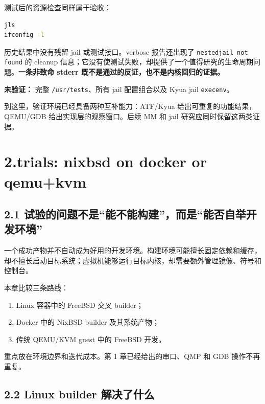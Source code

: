 \documentclass[
  11pt,
  UTF8,
  a4paper,
  fontset=fandol]{ctexart}
\newcommand{\passthrough}[1]{#1}
\providecommand{\tightlist}{%
  \setlength{\itemsep}{0pt}\setlength{\parskip}{0pt}}
\begin{document}
测试后的资源检查同样属于验收：

\begin{lstlisting}[language=sh]
jls
ifconfig -l
\end{lstlisting}

历史结果中没有残留 jail 或测试接口。verbose 报告还出现了
\passthrough{\lstinline!nestedjail not found!} 的 cleanup
信息；它没有使测试失败，却提供了一个值得研究的生命周期问题。\textbf{一条非致命
stderr 既不是通过的反证，也不是内核回归的证据。}

\textbf{未验证：} 完整 \passthrough{\lstinline!/usr/tests!}、所有 jail
配置组合以及 Kyua jail \passthrough{\lstinline!execenv!}。

到这里，验证环境已经具备两种互补能力：ATF/Kyua
给出可重复的功能结果，QEMU/GDB 给出实现层的观察窗口。后续 MM 和 jail
研究应同时保留这两类证据。

\section{2.trials: nixbsd on docker or
qemu+kvm}\label{trials-nixbsd-on-docker-or-qemukvm}

\subsection{2.1
试验的问题不是``能不能构建''，而是``能否自举开发环境''}\label{ux8bd5ux9a8cux7684ux95eeux9898ux4e0dux662fux80fdux4e0dux80fdux6784ux5efaux800cux662fux80fdux5426ux81eaux4e3eux5f00ux53d1ux73afux5883}

一个成功产物并不自动成为好用的开发环境。构建环境可能擅长固定依赖和缓存，却不擅长启动目标系统；虚拟机能够运行目标内核，却需要额外管理镜像、符号和控制台。

本章比较三条路线：

\begin{enumerate}
\def\labelenumi{\arabic{enumi}.}
\tightlist
\item
  Linux 容器中的 FreeBSD 交叉 builder；
\item
  Docker 中的 NixBSD builder 及其系统产物；
\item
  传统 QEMU/KVM guest 中的 FreeBSD 开发。
\end{enumerate}

重点放在环境边界和迭代成本。第 1 章已经给出的串口、QMP 和 GDB
操作不再重复。

\subsection{2.2 Linux builder
解决了什么}\label{linux-builder-ux89e3ux51b3ux4e86ux4ec0ux4e48}
\end{document}
